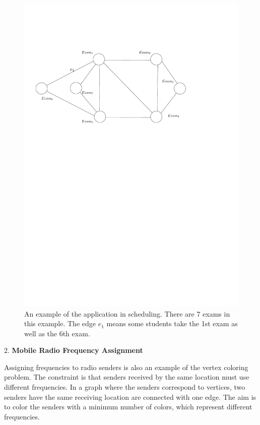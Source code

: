 \documentclass[12pt,a4paper,twoside]{scrartcl}
\numberwithin{equation}{section}
\begin{document}
\begin{figure}[h]
\centering
 \hbox{\hspace{7em}\includegraphics[scale=0.7]{1/timeTable.pdf}} 
  \caption{An example of the application in scheduling.   There are 7 exams in this example. The edge $e_1$ means some students take the 1st exam as well as the 6th exam.} 
\end{figure}
2. \textbf{Mobile Radio Frequency Assignment} \cite{gamst1986some}

Assigning frequencies to radio senders is also an example of the vertex coloring problem. The constraint is that senders received by the same location must use different frequencies. In a graph where the senders correspond to vertices, two senders have the same receiving location are connected with one edge. The aim is to color the senders with a minimum number of colors, which represent different frequencies.
\end{document}
